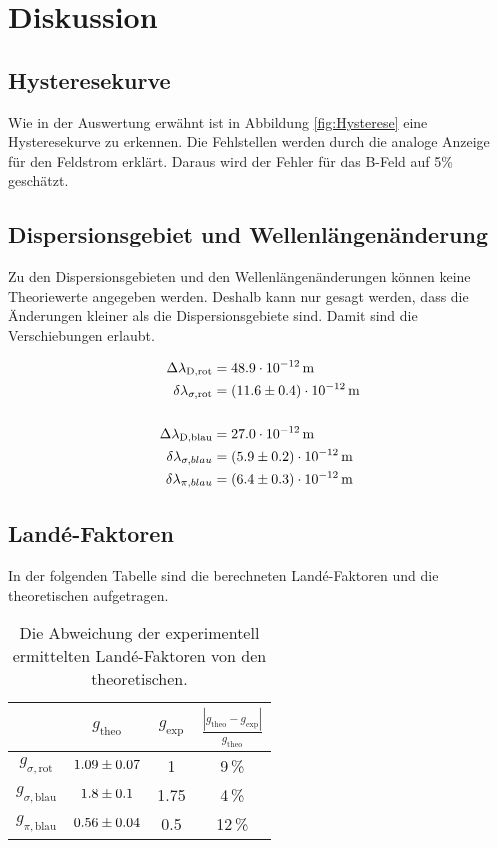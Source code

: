 \section{Diskussion}
\label{sec:Diskussion}
\subsection{Hysteresekurve}
Wie in der Auswertung erwähnt ist in Abbildung \eqref{fig:Hysterese} eine Hysteresekurve zu erkennen. Die Fehlstellen werden durch die analoge Anzeige für den Feldstrom erklärt. Daraus wird der Fehler für das B-Feld auf 5\% geschätzt.


\subsection{Dispersionsgebiet und Wellenlängenänderung}
Zu den Dispersionsgebieten und den Wellenlängenänderungen können keine Theoriewerte angegeben werden. Deshalb kann nur gesagt werden, dass die Änderungen kleiner als die Dispersionsgebiete sind. Damit sind die Verschiebungen erlaubt.

\begin{align*}
  \Delta\lambda_\text{D,rot} &= 48.9 \cdot 10^{-12}\,\text{m} \\
  \delta \lambda_{\sigma,\text{rot}} &= (\num{11.6 +- 0.4})\cdot 10^{-12}\,\text{m} \\
  \\
  \Delta\lambda_\text{D,blau} &= 27.0 \cdot 10^{-12}\,\text{m} \\
  \delta \lambda_{\sigma,blau} &= (\num{5.9 +- 0.2})\cdot 10^{-12}\,\text{m} \\
  \delta \lambda_{\pi,blau} &= (\num{6.4 +- 0.3})\cdot 10^{-12}\,\text{m}
\end{align*}


\subsection{Landé-Faktoren}
In der folgenden Tabelle sind die berechneten Landé-Faktoren und die theoretischen aufgetragen.

\begin{table}[H]
   \centering
   \caption{Die Abweichung der experimentell ermittelten Landé-Faktoren von den theoretischen.}
   \label{tab:}
   \begin{tabular}{c|c|c|c}
     & $g_\text{theo}$ & $g_\text{exp}$ & $\frac{|g_\text{theo} - g_\text{exp}|}{g_\text{theo}}$ \\
     \hline
     $g_{\sigma,\text{rot}}$  & $\num{1.09 +- 0.07}$ & 1 & 9\,\% \\
     $g_{\sigma,\text{blau}}$ & $\num{1.8 +- 0.1}$   & 1.75 & 4\,\% \\
     $g_{\pi,\text{blau}}$    & $\num{0.56 +- 0.04}$ & 0.5 & 12\,\% \\
   \end{tabular}
\end{table}

